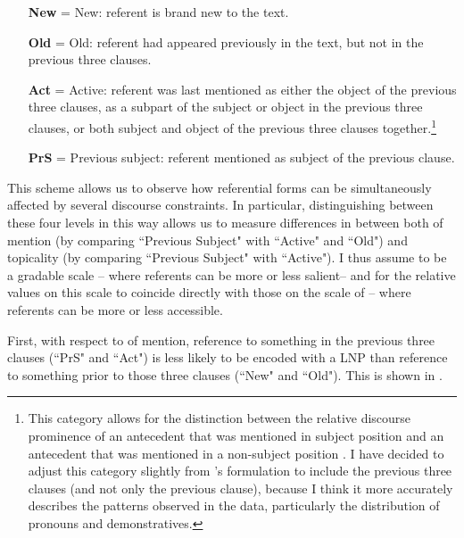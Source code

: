 \begin{itemize}
\item[\textbf{New}] = New: referent is brand new to the text.

\item[\textbf{Old}] = Old: referent had appeared previously in the text, but not in the previous three clauses.

\item[\textbf{Act}] = Active: referent was last mentioned as either the object of the previous three clauses, as a subpart of the subject or object in the previous three clauses, or both subject and object of the previous three clauses together.\footnote{This category allows for the distinction between the relative discourse prominence of an antecedent that was mentioned in subject position and an antecedent that was mentioned in a non-subject position \citep[226]{arnold2003}. I have decided to adjust this category slightly from \citet[231]{arnold2003}'s formulation to include the previous three clauses (and not only the previous clause), because I think it more accurately describes the patterns observed in the data, particularly the distribution of pronouns and demonstratives.}

\item[\textbf{PrS}] = Previous subject: referent mentioned as subject of the previous clause.
\end{itemize}

\z
This scheme allows us to observe how referential forms can be simultaneously affected by several discourse constraints. In particular, distinguishing between these four levels in this way allows us to measure differences in  between both  of mention (by comparing ``Previous Subject" with ``Active" and ``Old") and topicality (by comparing ``Previous Subject" with ``Active"). I thus assume  to be a gradable scale \citep{hopper1980} -- where referents can be more or less salient-- and for the relative values on this scale to coincide directly with those on the scale of  -- where referents can be more or less accessible. 

First, with respect to  of mention, reference to something in the previous three clauses (``PrS" and ``Act") is less likely to be encoded with a LNP than reference to something prior to those three clauses (``New" and ``Old"). This is shown in .

